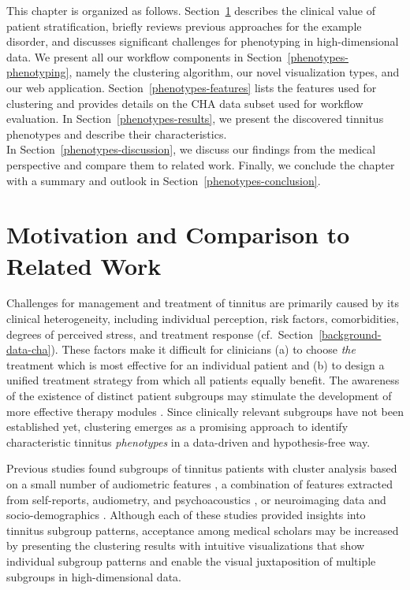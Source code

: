 \documentclass[
  oneside]{book}
\begin{document}
This chapter is organized as follows.
Section~\ref{phenotypes-motivation} describes the clinical value of patient stratification, briefly reviews previous approaches for the example disorder, and discusses significant challenges for phenotyping in high-dimensional data.
We present all our workflow components in Section~\ref{phenotypes-phenotyping}, namely the clustering algorithm, our novel visualization types, and our web application.
Section~\ref{phenotypes-features} lists the features used for clustering and provides details on the CHA data subset used for workflow evaluation.
In Section~\ref{phenotypes-results}, we present the discovered tinnitus phenotypes and describe their characteristics.\\
In Section~\ref{phenotypes-discussion}, we discuss our findings from the medical perspective and compare them to related work.
Finally, we conclude the chapter with a summary and outlook in Section~\ref{phenotypes-conclusion}.

\hypertarget{phenotypes-motivation}{%
\section{Motivation and Comparison to Related Work}\label{phenotypes-motivation}}

Challenges for management and treatment of tinnitus are primarily caused by its clinical heterogeneity, including individual perception, risk factors, comorbidities, degrees of perceived stress, and treatment response (cf.~Section~\ref{background-data-cha}).
These factors make it difficult for clinicians (a) to choose \emph{the} treatment which is most effective for an individual patient and (b) to design a unified treatment strategy from which all patients equally benefit.
The awareness of the existence of distinct patient subgroups may stimulate the development of more effective therapy modules \autocite{genitsaridi2020review}.
Since clinically relevant subgroups have not been established yet, clustering emerges as a promising approach to identify characteristic tinnitus \emph{phenotypes} in a data-driven and hypothesis-free way.

Previous studies found subgroups of tinnitus patients with cluster analysis based on a small number of audiometric features \autocite{Langguth:LCA2017}, a combination of features extracted from self-reports, audiometry, and psychoacoustics \autocite{Tyler:TinnitusClustering2008}, or neuroimaging data and
socio-demographics \autocite{Schecklmann:BrainResearch2012}.
Although each of these studies provided insights into tinnitus subgroup patterns, acceptance among medical scholars may be increased by presenting the clustering results with intuitive visualizations that show individual subgroup patterns and enable the visual juxtaposition of multiple subgroups in high-dimensional data.
\end{document}
